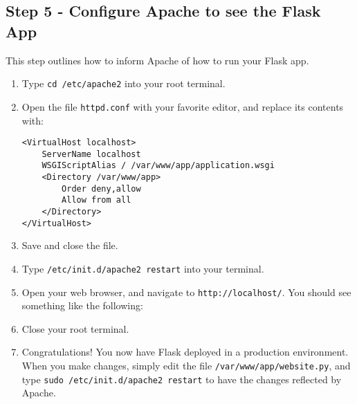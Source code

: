 \documentclass{article}
\begin{document}
\subsection{Step 5 - Configure Apache to see the Flask App}
This step outlines how to inform Apache of how to run your Flask app.
\begin{enumerate}
\item Type \verb+cd /etc/apache2+ into your root terminal.
\item Open the file \verb+httpd.conf+ with your favorite editor, and replace its
contents with:
\begin{verbatim}
<VirtualHost localhost>
	ServerName localhost
    WSGIScriptAlias / /var/www/app/application.wsgi
    <Directory /var/www/app>
        Order deny,allow
        Allow from all
    </Directory>
</VirtualHost>
\end{verbatim}
\item Save and close the file.
\item Type \verb+/etc/init.d/apache2 restart+ into your terminal.
\item Open your web browser, and navigate to \verb+http://localhost/+. You should see something
like the following:
\item Close your root terminal.
\item Congratulations! You now have Flask deployed in a production environment. When you make
changes, simply edit the file \verb+/var/www/app/website.py+, and type \verb+sudo /etc/init.d/apache2 restart+ to have the changes reflected by Apache.
\end{enumerate}
\end{document}
